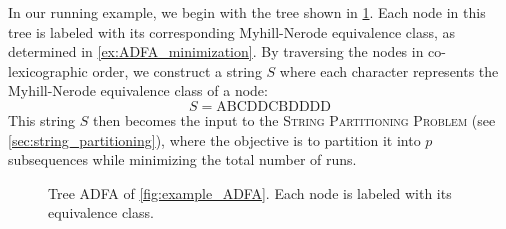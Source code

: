 \begin{example} \label{ex:string_example}
    In our running example, we begin with the tree shown in \cref{fig:original_tree}. Each node in this tree is labeled with its corresponding Myhill-Nerode equivalence class, as determined in \cref{ex:ADFA_minimization}. By traversing the nodes in co-lexicographic order, we construct a string $S$ where each character represents the Myhill-Nerode equivalence class of a node:
    \[
        S = \text{ABCDDCBDDDD}
    \]
    This string $S$ then becomes the input to the \textsc{String Partitioning Problem} (see \cref{sec:string_partitioning}), where the objective is to partition it into $p$ subsequences while minimizing the total number of runs.

    \begin{figure}[H]
        \centering
        \caption{Tree ADFA of \cref{fig:example_ADFA}. Each node is labeled with its equivalence class.}
        \label{fig:original_tree}
    \end{figure}
\end{example}
